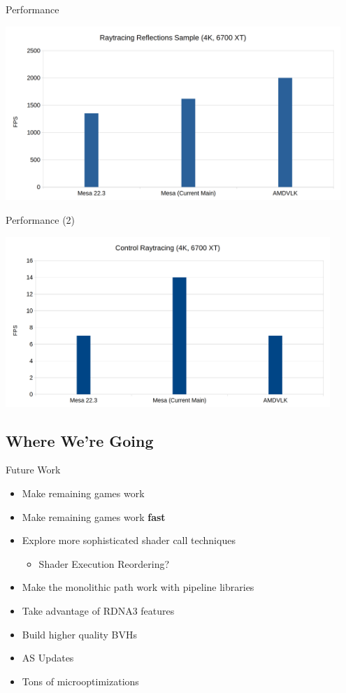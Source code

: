 \documentclass[aspectratio=169,t]{beamer}
\begin{document}
\begin{slide}{Performance}
\begin{center}
  \includegraphics[width=0.95\textwidth]{graphics/perfcomparison-rtreflections.png}
\end{center}
\end{slide}

\begin{slide}{Performance (2)}
\begin{center}
  \includegraphics[width=0.92\textwidth]{graphics/perfcomparison-control.png}
\end{center}
\end{slide}

\subsection{Where We're Going}
\begin{slide}{Future Work}
 \begin{itemize}
  \item Make remaining games work
  \item Make remaining games work \textbf{fast}
  \item Explore more sophisticated shader call techniques
  \begin{itemize}
   \item Shader Execution Reordering?
  \end{itemize}
  \item Make the monolithic path work with pipeline libraries
  \item Take advantage of RDNA3 features
  \item Build higher quality BVHs
  \item AS Updates
  \item Tons of microoptimizations
 \end{itemize}

\end{slide}
\end{document}
